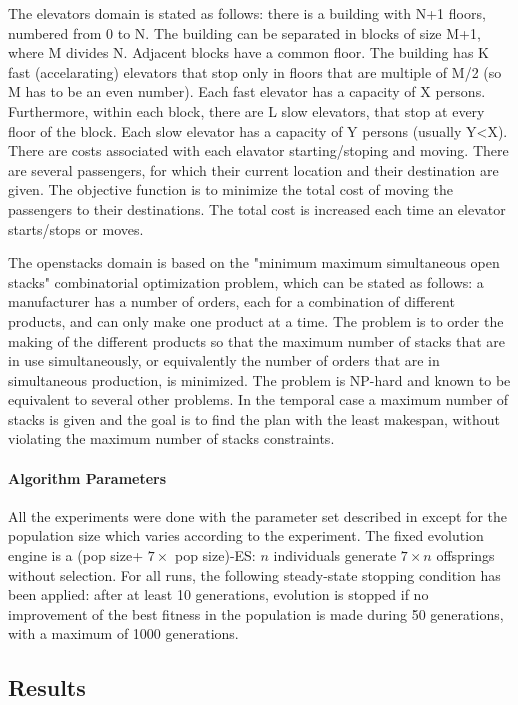 \documentclass{sig-alternate}
\begin{document}
The elevators domain is stated as follows: there is a building with N+1 floors, numbered from 0 to N. The building can be separated in blocks of size M+1, where M divides N. Adjacent blocks have a common floor. The building has K fast (accelarating) elevators that stop only in floors that are multiple of M/2 (so M has to be an even number). Each fast elevator has a capacity of X persons. Furthermore, within each block, there are L slow elevators, that stop at every floor of the block. Each slow elevator has a capacity of Y persons (usually Y<X).
There are costs associated with each elavator starting/stoping and moving. There are several passengers, for which their current location and their destination are given.
The objective function is to minimize the total cost of moving the passengers to their destinations. The total cost is increased each time an elevator starts/stops or moves.

The openstacks domain is based on the "minimum maximum simultaneous open stacks" combinatorial optimization problem, which can be stated as follows: a manufacturer has a number of orders, each for a combination of different products, and can only make one product at a time. The problem is to order the making of the different products so that the maximum number of stacks that are in use simultaneously, or equivalently the number of orders that are in simultaneous production, is minimized. The problem is NP-hard and known to be equivalent to several other problems. In the temporal case a maximum number of stacks is given and the goal is to find the plan with the least makespan, without violating the maximum number of stacks constraints.


\paragraph{Algorithm Parameters} %

All the experiments were done with the parameter set described in \cite{dae:icaps2010} except for the population size which varies according to the experiment.
The fixed evolution engine is a (pop size+ $7 \times$ pop size)-ES: $n$ individuals generate $7 \times n$ offsprings without selection.
For all runs, the following steady-state stopping condition has been applied: after at least 10 generations, evolution is stopped if no improvement of the best fitness in the
population is made during 50 generations, with a maximum of 1000 generations.

\subsection{Results}
\end{document}
